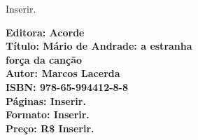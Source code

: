 \noindent{}Inserir.

\vfill
\hspace*{-.4cm}\begin{minipage}[c]{.5\linewidth}
\small\textbf{
\hspace*{-.1cm}Editora: Acorde\\
Título: Mário de Andrade: a estranha\\força da canção\\
Autor: Marcos Lacerda\\ 
ISBN: 978-65-994412-8-8\\
Páginas: Inserir.\\
Formato: Inserir.\\
Preço: R\$ Inserir.\\
}
\end{minipage}
\pagebreak

\vspace*{1.5cm}
\bigskip

\hfill{}
\bigskip
\bigskip
\bigskip

